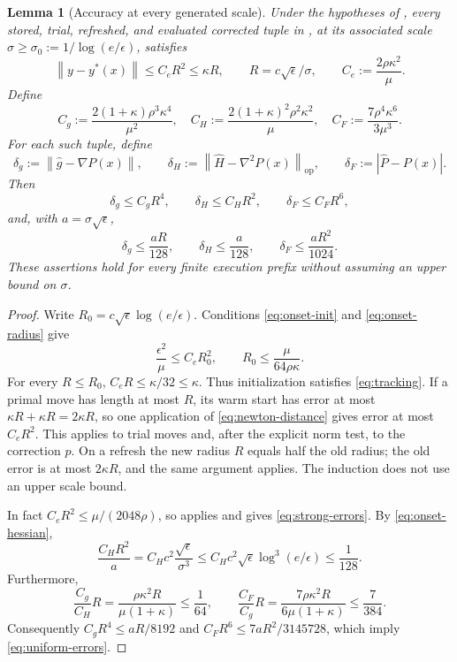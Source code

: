 \documentclass[11pt]{article}
\numberwithin{equation}{section}
\newtheorem{lemma}[assumption]{Lemma}
\newcommand{\eps}{\epsilon}
\newcommand{\norm}[1]{\left\lVert#1\right\rVert}
\newcommand{\op}{\mathrm{op}}
\begin{document}
\begin{lemma}[Accuracy at every generated scale]\label{lem:tracking}
Under the hypotheses of , every stored, trial,
refreshed, and evaluated corrected tuple in ,
at its associated scale $\sigma\ge\sigma_0:=1/\log(e/\eps)$,
satisfies
\begin{equation}\label{eq:tracking}
 \norm{y-y^*(x)}\le C_eR^2\le\kappa R,
 \qquad R=c\sqrt\eps/\sigma,
 \qquad C_e:=\frac{2\rho\kappa^2}{\mu}.
\end{equation}
Define
\begin{equation}\label{eq:error-coefficients}
 C_g:=\frac{2(1+\kappa)\rho^3\kappa^4}{\mu^2},
 \quad C_H:=\frac{2(1+\kappa)^2\rho^2\kappa^2}{\mu},
 \quad C_F:=\frac{7\rho^4\kappa^6}{3\mu^3}.
\end{equation}
For each such tuple, define
\[
 \delta_g:=\norm{\widehat g-\nabla P(x)},\qquad
 \delta_H:=\norm{\widehat H-\nabla^2P(x)}_{\op},\qquad
 \delta_F:=|\widehat P-P(x)|.
\]
Then
\begin{equation}\label{eq:strong-errors}
 \delta_g\le C_gR^4,\qquad
 \delta_H\le C_HR^2,\qquad
 \delta_F\le C_FR^6,
\end{equation}
and, with $a=\sigma\sqrt\eps$,
\begin{equation}\label{eq:uniform-errors}
 \delta_g\le\frac{aR}{128},\qquad
 \delta_H\le\frac a{128},\qquad
 \delta_F\le\frac{aR^2}{1024}.
\end{equation}
These assertions hold for every finite execution prefix without
assuming an upper bound on $\sigma$.
\end{lemma}

\begin{proof}
Write $R_0=c\sqrt\eps\log(e/\eps)$.
Conditions \eqref{eq:onset-init} and \eqref{eq:onset-radius} give
\[
 \frac{\eps^2}{\mu}\le C_eR_0^2,
 \qquad R_0\le\frac{\mu}{64\rho\kappa}.
\]
For every $R\le R_0$, $C_eR\le\kappa/32\le\kappa$.
Thus initialization satisfies \eqref{eq:tracking}.
If a primal move has length at most $R$, its warm start has error at
most $\kappa R+\kappa R=2\kappa R$, so one application of
\eqref{eq:newton-distance} gives error at most $C_eR^2$.
This applies to trial moves and, after the explicit norm test, to
the correction $p$.
On a refresh the new radius $R$ equals half the old radius; the old
error is at most $2\kappa R$, and the same argument applies.
The induction does not use an upper scale bound.

In fact $C_eR^2\le\mu/(2048\rho)$, so
 applies and gives
\eqref{eq:strong-errors}. By \eqref{eq:onset-hessian},
\[
 \frac{C_HR^2}{a}
 =C_Hc^2\frac{\sqrt\eps}{\sigma^3}
 \le C_Hc^2\sqrt\eps\log^3(e/\eps)\le\frac1{128}.
\]
Furthermore,
\[
 \frac{C_g}{C_H}R
 =\frac{\rho\kappa^2R}{\mu(1+\kappa)}\le\frac1{64},
 \qquad
 \frac{C_F}{C_g}R
 =\frac{7\rho\kappa^2R}{6\mu(1+\kappa)}\le\frac7{384}.
\]
Consequently $C_gR^4\le aR/8192$ and
$C_FR^6\le7aR^2/3145728$, which imply
\eqref{eq:uniform-errors}.
\end{proof}
\end{document}
